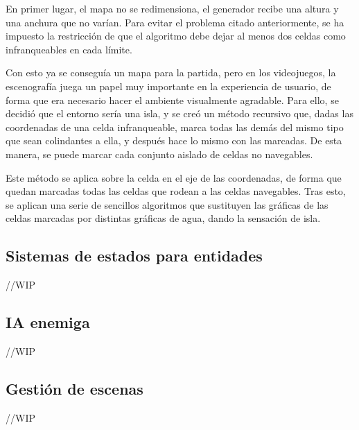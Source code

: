 		En primer lugar, el mapa no se redimensiona, el generador recibe una altura y una anchura que no varían. Para evitar el problema citado anteriormente, se ha impuesto la restricción de que el algoritmo debe dejar al menos dos celdas como infranqueables en cada límite.

		Con esto ya se conseguía un mapa para la partida, pero en los videojuegos, la escenografía juega un papel muy importante en la experiencia de usuario, de forma que era necesario hacer el ambiente visualmente agradable. Para ello, se decidió que el entorno sería una isla, y se creó un método recursivo que, dadas las coordenadas de una celda infranqueable, marca todas las demás del mismo tipo que sean colindantes a ella, y después hace lo mismo con las marcadas. De esta manera, se puede marcar cada conjunto aislado de celdas no navegables.

		Este método se aplica sobre la celda en el eje de las coordenadas, de forma que quedan marcadas todas las celdas que rodean a las celdas navegables. Tras esto, se aplican una serie de sencillos algoritmos que sustituyen las gráficas de las celdas marcadas por distintas gráficas de agua, dando la sensación de isla.

	\subsection{Sistemas de estados para entidades}

		//WIP

	\subsection{IA enemiga}

		//WIP

	\subsection{Gestión de escenas}

		//WIP
